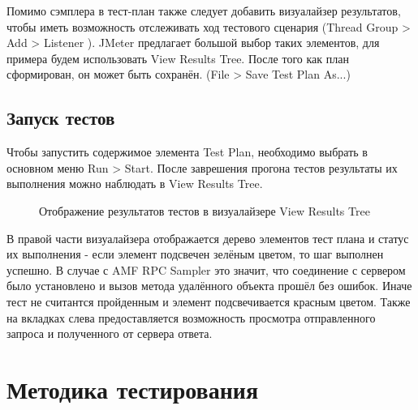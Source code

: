 Помимо сэмплера в тест-план также следует добавить визуалайзер результатов, чтобы иметь возможность
отслеживать ход тестового сценария (Thread Group > Add > Listener ).
JMeter предлагает большой выбор таких элементов, для примера будем использовать View Results Tree.
После того как план сформирован, он может быть сохранён. (File > Save Test Plan As...)

\subsection{Запуск тестов}

Чтобы запустить содержимое элемента Test Plan, необходимо выбрать в основном меню Run > Start.
После заврешения прогона тестов результаты их выполнения можно наблюдать в View Results Tree.

\begin{figure}[ht]
\caption{Отображение результатов тестов в визуалайзере View Results Tree}
\label{ris:testResults.png}
\end{figure}

В правой части визуалайзера отображается дерево элементов тест плана и статус 
их выполнения - если элемент подсвечен зелёным цветом, то шаг выполнен 
успешно. В случае с AMF RPC Sampler это значит, что соединение с сервером было установлено 
и вызов метода удалённого объекта прошёл без ошибок. Иначе тест не считантся пройденным и 
элемент подсвечивается красным цветом. Также на вкладках слева предоставляется 
возможность просмотра отправленного запроса и полученного от сервера ответа.  

\section{Методика тестирования}